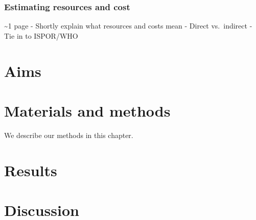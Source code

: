 \documentclass[]{book}
\theoremstyle{definition}
\theoremstyle{definition}
\theoremstyle{definition}
\theoremstyle{remark}
\begin{document}
\subsection{Estimating resources and
cost}\label{estimating-resources-and-cost}

\textasciitilde{}1 page - Shortly explain what resources and costs mean
- Direct vs.~indirect - Tie in to ISPOR/WHO

\chapter{Aims}\label{aims}

\chapter{Materials and methods}\label{methods}

We describe our methods in this chapter.

\chapter{Results}\label{results}

\chapter{Discussion}\label{discussion}


\end{document}
